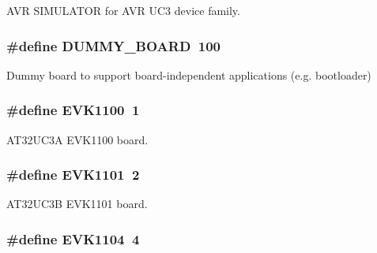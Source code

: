 A\-V\-R S\-I\-M\-U\-L\-A\-T\-O\-R for A\-V\-R U\-C3 device family. 

\hypertarget{group__group__common__boards_gac33d75ae101690822610338fdff2e95b}{
\subsubsection[{D\-U\-M\-M\-Y\-\_\-\-B\-O\-A\-R\-D}]{\setlength{\rightskip}{0pt plus 5cm}\#define D\-U\-M\-M\-Y\-\_\-\-B\-O\-A\-R\-D~100}}\label{group__group__common__boards_gac33d75ae101690822610338fdff2e95b}
Dummy board to support board-\/independent applications (e.\-g. bootloader) \hypertarget{group__group__common__boards_gaf70755335cc477c22a31a4126deddbcc}{
\subsubsection[{E\-V\-K1100}]{\setlength{\rightskip}{0pt plus 5cm}\#define E\-V\-K1100~1}}\label{group__group__common__boards_gaf70755335cc477c22a31a4126deddbcc}


A\-T32\-U\-C3\-A E\-V\-K1100 board. 

\hypertarget{group__group__common__boards_gace9c401dee7de17633d3edb4a773a842}{
\subsubsection[{E\-V\-K1101}]{\setlength{\rightskip}{0pt plus 5cm}\#define E\-V\-K1101~2}}\label{group__group__common__boards_gace9c401dee7de17633d3edb4a773a842}


A\-T32\-U\-C3\-B E\-V\-K1101 board. 

\hypertarget{group__group__common__boards_ga98bb86fc9e11beea9c609d63393ae3ff}{
\subsubsection[{E\-V\-K1104}]{\setlength{\rightskip}{0pt plus 5cm}\#define E\-V\-K1104~4}}\label{group__group__common__boards_ga98bb86fc9e11beea9c609d63393ae3ff}


